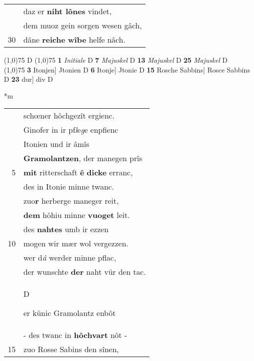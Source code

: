\documentclass[8pt,a4paper,notitlepage]{article}
\begin{document}
\begin{table}[ht]
\begin{minipage}[t]{0.5\linewidth}
\begin{tabular}{rl}
 & daz er \textbf{niht lônes} vindet,\\ 
 & dem muoz gein sorgen wesen gâch,\\ 
30 & dâne \textbf{reiche} \textbf{wîbe} helfe nâch.\\ 
\end{tabular}
\scriptsize
\line(1,0){75} \newline
D \newline
\line(1,0){75} \newline
\textbf{1} \textit{Initiale} D  \textbf{7} \textit{Majuskel} D  \textbf{13} \textit{Majuskel} D  \textbf{25} \textit{Majuskel} D  \newline
\line(1,0){75} \newline
\textbf{3} Itonjen] Jtonien D \textbf{6} Itonje] Jtonie D \textbf{15} Rosche Sabbins] Rosce Sabbins D \textbf{23} dur] div D \newline
\end{minipage}
\hspace{0.5cm}
\begin{minipage}[t]{0.5\linewidth}
\small
\begin{center}*m
\end{center}
\begin{tabular}{rl}
 & schœner hôchgezît ergienc.\\ 
 & Ginofer in ir pf\textit{l}e\textit{g}e enpfienc\\ 
 & Itonien und ir âmîs\\ 
 & \textbf{Gramolantzen}, der manegen prîs\\ 
5 & \textbf{mit} ritterschaft \textbf{ê} \textbf{dicke} erranc,\\ 
 & des in Itonie minne twanc.\\ 
 & zuo\textbf{r} herberge maneger reit,\\ 
 & \textbf{dem} hôhiu minne \textbf{vuoget} leit.\\ 
 & des \textbf{nahtes} umb ir ezzen\\ 
10 & mogen wir mær wol vergezzen.\\ 
 & wer d\textit{â} werder minne pflac,\\ 
 & der wunschte \textbf{der} naht vür den tac.\\ 
 & \begin{large}D\end{large}er künic Gramolantz enbôt\\ 
 & - des twanc in \textbf{hôchvart} nôt -\\ 
15 & zuo Rosse Sabins den sînen,\\ 

\end{tabular}
\end{minipage}
\end{table}
\end{document}
